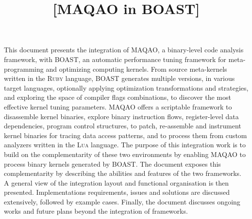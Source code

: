 \documentclass[11pt, a4paper, twoside]{montblanc2}
\def\lua{\textsc{Lua}\xspace}
\def\ruby{\textsc{Ruby}\xspace}
\begin{document}
\devnum{[5.11]}
\title{[MAQAO in BOAST]}
\version{[0.2]}
\deadline{[2017/01/16]}
\level{[PU]}
\nature{[O]}

\maketitle

\begin{changelog}
\end{changelog}

\frontmatter

\begin{executive}

  This document presents the integration of MAQAO, a binary-level code analysis 
  framework, with BOAST, an automatic performance tuning framework for 
  meta-programming and optimizing computing kernels. From source meta-kernels 
  written in the \ruby language, BOAST generates multiple versions, in various 
  target languages, optionally applying optimization transformations and 
  strategies, and exploring the space of compiler flags combinations, to 
  discover the most effective kernel tuning parameters. MAQAO offers a 
  scriptable framework to disassemble kernel binaries, explore binary 
  instruction flows, register-level data dependencies, program control 
  structures, to patch, re-assemble and instrument kernel binaries for tracing data 
  access patterns, and to process them from custom analyzers written in the \lua 
  language. The purpose of this integration work is to build on the 
  complementarity of these two environments by enabling MAQAO to process binary 
  kernels generated by BOAST. The document exposes this complementarity by 
  describing the abilities and features of the two frameworks. A general view of 
  the integration layout and functional organisation is then presented. 
  Implementations requirements, issues and solutions are discussed extensively, 
  followed by example cases. Finally, the document discusses ongoing works and future 
  plans beyond the integration of frameworks.

\end{executive}
\end{document}
